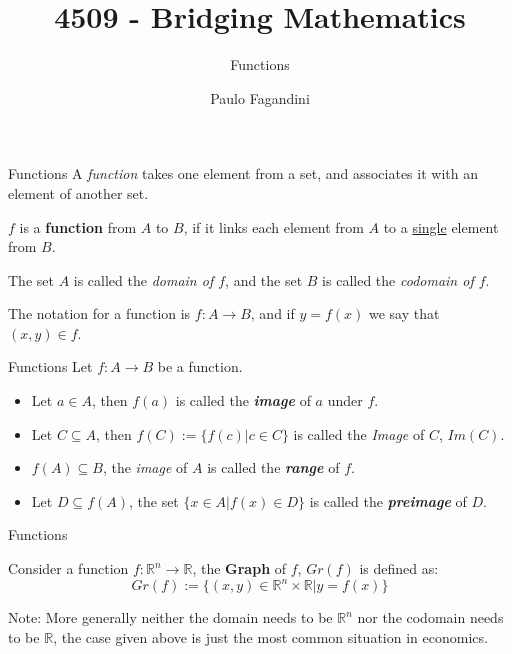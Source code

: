 \documentclass[aspectratio=169]{beamer}
\title[]{4509 - Bridging Mathematics}
\subtitle{Functions}
\author[P. Fagandini]{Paulo Fagandini}
\institute[]{}
\date{}
\begin{document}
\begin{frame}{Functions}
     A \emph{function} takes one element from a set, and associates it with an element of another set.
     
     \begin{definition}
        $f$ is a \textbf{function} from $A$ to $B$, if it links each element from $A$ to a \underline{single} element from $B$.
        
        The set $A$ is called the \emph{domain of $f$}, and the set $B$ is called the \emph{codomain of $f$}.
     \end{definition}
     
     The notation for a function is $f:A\rightarrow B$, and if $y=f(x)$ we say that $(x,y)\in f$.
     
\end{frame}

\begin{frame}{Functions}
    Let $f:A\rightarrow B$ be a function.
    \begin{itemize}
        \item Let $a\in A$, then $f(a)$ is called the \textit{\textbf{image}} of $a$ under $f$.
        \item Let $C\subseteq A$, then $f(C):=\{f(c)|c\in C\}$ is called the \textit{Image} of $C$, $Im(C)$.
        \item $f(A)\subseteq B$, the \textit{image} of $A$ is called the \textit{\textbf{range}} of $f$.
        \item Let $D\subseteq f(A)$, the set $\{x\in A | f(x) \in D\}$ is called the \textit{\textbf{preimage}} of $D$.
    \end{itemize}
\end{frame}

\begin{frame}{Functions}
    \begin{definition}
        Consider a function $f:\mathds{R}^n\rightarrow\mathds{R}$, the \textbf{Graph} of $f$, $Gr(f)$ is defined as:
        $$Gr(f):=\{(x,y)\in \mathds{R}^n\times\mathds{R}|y=f(x)\}$$
    \end{definition}
    
    \pause
    
    Note: More generally neither the domain needs to be $\mathds{R}^n$ nor the codomain needs to be $\mathds{R}$, the case given above is just the most common situation in economics.
\end{frame}
\end{document}
